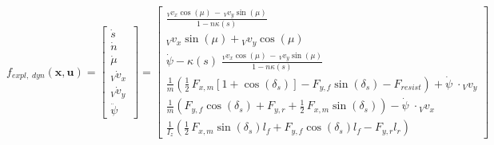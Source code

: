 \documentclass[
a4paper, %
10pt, %
notitlepage,
english]{CSUniSchoolLabReport}
\begin{document}
\begin{equation}
	f_{expl,\;dyn}(\mathbf{x}, \mathbf{u}) =
	\left[\begin{array}{c}

		\dot{s} \\

		\dot{n} \\

		\dot{\mu} \\

		{}_V\dot{v}_x \\

		{}_V\dot{v}_y \\

		\ddot{\psi}\;\;\;

	\end{array}\right] =
	\left[\begin{array}{c}

		\frac{{}_V v_x \cos(\mu) \,-\, {}_V v_y \sin(\mu)}{1 - n \kappa(s)} \\

		{}_V v_x \sin(\mu) + {}_V v_y \cos(\mu) \\

		\dot{\psi} - \kappa(s)\;\frac{{}_V v_x \cos(\mu) \,-\, {}_V v_y \sin(\mu)}{1 - n \kappa(s)} \\

		\frac{1}{m}  \left( \frac{1}{2} \, F_{x, m} \left[1 + \cos(\delta_s)\right] - F_{y, f} \sin(\delta_s) - F_{resist} \right) + \dot{\psi}\;\cdot {}_V v_y \\

		\frac{1}{m}  \left( F_{y, f} \cos(\delta_s) + F_{y, r} + \frac{1}{2} \, F_{x, m} \sin(\delta_s) \right) - \dot{\psi}\;\cdot {}_V v_x \\

		\frac{1}{I_z}  \left( \frac{1}{2} \, F_{x, m} \sin(\delta_s) l_f + F_{y, f} \cos(\delta_s) l_f - F_{y, r} l_r \right)
	\end{array}\right]
\end{equation}
\end{document}
